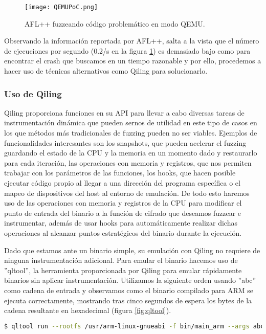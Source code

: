 \begin{figure}[H]
    \centering
    \texttt{[image: QEMUPoC.png]}
    \caption{AFL++ fuzzeando código problemático en modo QEMU.}
    \label{fig:QEMUPoC}
\end{figure}

Observando la información reportada por AFL++, salta a la vista que el número de ejecuciones por segundo (0.2/s en la figura \ref{fig:QEMUPoC}) es demasiado bajo como para encontrar 
el crash que buscamos en un tiempo razonable y por ello, procedemos a hacer uso de técnicas alternativos como Qiling para solucionarlo.

\subsubsection{Uso de Qiling}
Qiling proporciona funciones en su API para llevar a cabo diversas tareas de instrumentación dinámica que pueden sernos de utilidad en este 
tipo de casos en los que métodos más tradicionales de fuzzing pueden no ser viables. Ejemplos de funcionalidades interesantes son los snapshots,
que pueden acelerar el fuzzing guardando el estado de la CPU y la memoria en un momento dado y restaurarlo para cada iteración, las operaciones 
con memoria y registros, que nos permiten trabajar con los parámetros de las funciones, los hooks, que hacen posible ejecutar código propio al 
llegar a una dirección del programa específica o el mapeo de dispositivos del host al entorno de emulación. De todo esto haremos uso de las 
operaciones con memoria y registros de la CPU para modificar el punto de entrada del binario a la función de cifrado que deseamos fuzzear e 
instrumentar, además de usar hooks para automáticamente realizar dichas operaciones al alcanzar puntos estratégicos del binario durante la 
ejecución.\bigskip

Dado que estamos ante un binario simple, su emulación con Qiling no requiere de ninguna instrumentación adicional. Para emular el binario 
hacemos uso de ''qltool'', la herramienta proporcionada por Qiling para emular rápidamente binarios sin aplicar instrumentación. Utilizamos la 
siguiente orden usando ''abc'' como cadena de entrada y observamos como el binario compilado para ARM se ejecuta correctamente, mostrando tras cinco segundos de espera los
bytes de la cadena resultante en hexadecimal (figura \ref{fig:qltool}).

\begin{lstlisting}[language=bash]
    $ qltool run --rootfs /usr/arm-linux-gnueabi -f bin/main_arm --args abc
\end{lstlisting}

